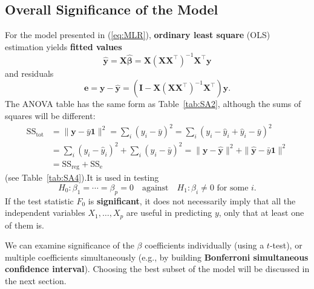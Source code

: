 \subsection{Overall Significance of the Model}
For the model presented in (\ref{eq:MLR}), \textbf{ordinary least square} (OLS) estimation yields \textbf{fitted values} $$\bm{\hat{y}}=\bm{X\hat{\beta}}=\bm{X}(\bm{XX}^{\!\top})^{-1}\bm{X}^{\!\top}\bm{y}$$ and residuals $$\bm{e}=\bm{y}-\bm{\hat{y}}=(\bm{I}-\bm{X}(\bm{XX}^{\!\top})^{-1}\bm{X}^{\!\top})\bm{y}.$$ The ANOVA table has the same form as Table~\ref{tab:SA2}, although the sums of squares will be different: \begin{align*}
   \text{SS}_{\textrm{tot}}&=\|\bm{y}-\bar{y}\bm{1}\|^2=\sum_{i}(y_{i}-\bar{y})^{2}=\sum_{i}(y_{i}-\hat{y}_i+\hat{y}_i-\bar{y})^{2}\\
    &=\sum_{i}(y_i-\hat{y}_{i})^{2}+\sum_{i}(\hat{y}_{i}-\bar{y})^2=\|\bm{y}-\bm{\hat{y}}\|^2+\|\bm{\hat{y}}-\bar{y}\bm{1}\|^2\\&=\text{SS}_{\textrm{reg}}+\text{SS}_{\textrm{e}}
\end{align*}
(see Table~\ref{tab:SA4}).\newpage\noindent It is used in testing $$H_{0}: \beta_{1} = \cdots = \beta_{p}=0\quad\mbox{against}\quad H_{1}: \beta_{i} \neq 0 \text{ for some  } i.$$ If the test statistic $F_{0}$ is \textbf{significant}, it does not necessarily imply that all the independent variables $X_1, \ldots, X_p$ are useful in predicting $y$, only that at least one of them is. \par We can examine significance of the $\beta$ coefficients individually (using a $t$-test), or multiple coefficients simultaneously (e.g., by building \textbf{Bonferroni simultaneous confidence interval}). Choosing the best subset of the model will be discussed in the next section.

